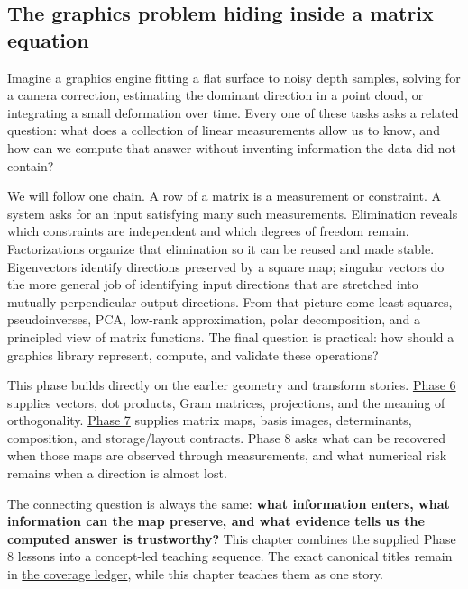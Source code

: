 \subsection{The graphics problem hiding inside a matrix equation}\label{01-foundations-i-ch019-the-graphics-problem-hiding-inside-a-matrix-equation}

\hypertarget{01-foundations-i-ch019-the-graphics-problem-hiding-inside-a-matrix-equation}{}

Imagine a graphics engine fitting a flat surface to noisy depth samples, solving for a camera correction, estimating the dominant direction in a point cloud, or integrating a small deformation over time. Every one of these tasks asks a related question: what does a collection of linear measurements allow us to know, and how can we compute that answer without inventing information the data did not contain?

We will follow one chain. A row of a matrix is a measurement or constraint. A system asks for an input satisfying many such measurements. Elimination reveals which constraints are independent and which degrees of freedom remain. Factorizations organize that elimination so it can be reused and made stable. Eigenvectors identify directions preserved by a square map; singular vectors do the more general job of identifying input directions that are stretched into mutually perpendicular output directions. From that picture come least squares, pseudoinverses, PCA, low-rank approximation, polar decomposition, and a principled view of matrix functions. The final question is practical: how should a graphics library represent, compute, and validate these operations?

This phase builds directly on the earlier geometry and transform stories. \hyperref[01-foundations-i-ch017-the-panel-gives-us-a-reason-to-learn]{Phase 6} supplies vectors, dot products, Gram matrices, projections, and the meaning of orthogonality. \hyperref[01-foundations-i-ch018-keep-the-promises-visible-while-moving-between-representations]{Phase 7} supplies matrix maps, basis images, determinants, composition, and storage/layout contracts. Phase 8 asks what can be recovered when those maps are observed through measurements, and what numerical risk remains when a direction is almost lost.

The connecting question is always the same: \textbf{what information enters, what information can the map preserve, and what evidence tells us the computed answer is trustworthy?} This chapter combines the supplied Phase 8 lessons into a concept-led teaching sequence. The exact canonical titles remain in \hyperref[appendix-fd090d982a15-phase-8---parts-701-800]{the coverage ledger}, while this chapter teaches them as one story.

